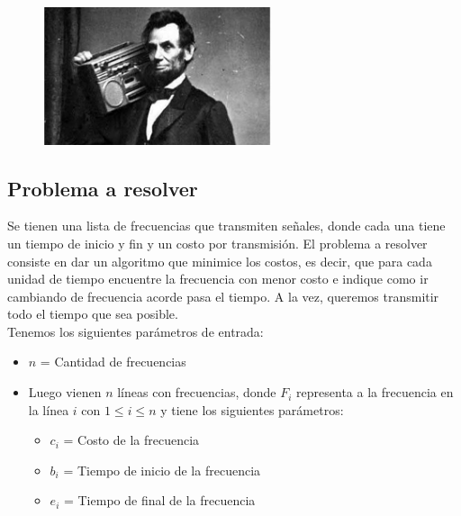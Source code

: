 \begin{figure}[h]
\begin{center}
\includegraphics[width=0.6\textwidth] {imagenes/frecuencia.jpeg}
\end{center}
\end{figure}

\subsection{Problema a resolver}
Se tienen una lista de frecuencias que transmiten señales, donde cada una tiene un tiempo de inicio y fin y un costo por transmisión. El problema a resolver consiste en dar un algoritmo que minimice los costos, es decir, que para cada unidad de tiempo encuentre la frecuencia con menor costo e indique como ir cambiando de frecuencia acorde pasa el tiempo. A la vez, queremos transmitir todo el tiempo que sea posible.\\

\smallskip
Tenemos los siguientes parámetros de entrada:
	\begin{itemize}[noitemsep,nolistsep]
      \item $n$ = Cantidad de frecuencias
	  \item Luego vienen $n$ líneas con frecuencias, donde $F_{i}$ representa a la frecuencia en la línea $i$ con $1 \leq i \leq n$ y tiene los siguientes parámetros:
      \begin{itemize}
      \item $c_{i}$ = Costo de la frecuencia
      \item $b_{i}$ = Tiempo de inicio de la frecuencia
      \item $e_{i}$ = Tiempo de final de la frecuencia
      \end{itemize}
  	\end{itemize}
\smallskip

